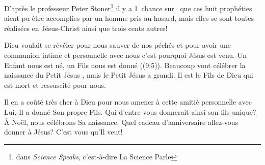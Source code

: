 D'après le professeur Peter Stoner\footnote{dans \emph{Science Speaks}, c'est-à-dire \Og La Science Parle \Fg{}} il y a 1~chance sur~ que ces huit prophéties aient pu être accomplies par un homme pris au hasard, mais elles se sont toutes réalisées en Jésus-Christ ainsi que trois cents autres!

Dieu voulait se révéler pour nous sauver de nos péchés et pour avoir une communion intime et personnelle avec nous\frcolon{} c'est pourquoi Jésus est venu. \Og Un Enfant nous est né, un Fils nous est donné \Fg{} ((9:5)). Beaucoup vont célébrer la naissance du \Og Petit Jésus \Fg{}, mais le \Og Petit Jésus \Fg{} a grandi. Il est le Fils de Dieu qui est mort et ressuscité pour nous.

Il en a coûté très cher à Dieu pour nous amener à cette amitié personnelle avec Lui. Il a donné Son propre Fils. Qui d'entre vous donnerait ainsi son fils unique? À Noël, nous célébrons Sa naissance. Quel cadeau d'anniversaire allez-vous donner à Jésus? C'est vous qu'Il veut!

\ornrule


